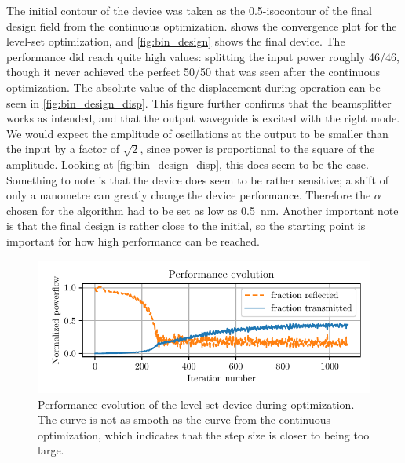 The initial contour of the device was taken as the 0.5-isocontour of the final
design field from the continuous optimization.
 shows the convergence plot for the level-set optimization,
and \cref{fig:bin_design} shows the final device.
The performance did reach quite high values: splitting the input power roughly
46/46, though it never achieved the perfect 50/50 that was seen after the
continuous optimization.
The absolute value of the displacement during operation can be seen in
\cref{fig:bin_design_disp}.
This figure further confirms that the beamsplitter works as intended, and that
the output waveguide is excited with the right mode.
We would expect the amplitude of oscillations at the output to be smaller than
the input by a factor of $\sqrt{2}$, since power is proportional to the square
of the amplitude.
Looking at \cref{fig:bin_design_disp}, this does seem to be the case.
Something to note is that the device does seem to be rather sensitive;
a shift of only a nanometre can greatly change the device performance.
Therefore the $\alpha$ chosen for the algorithm had to be set as low as
\qty{0.5}{\nm}.
Another important note is that the final design is rather close to the initial,
so the starting point is important for how high performance can be reached.

\begin{figure}[htpb]
	\centering
	\includegraphics{chapters/results/conv_tmp.pdf}
	\caption{%
		Performance evolution of the level-set device during optimization.
		The curve is not as smooth as the curve from the continuous
		optimization, which indicates that the step size is closer to being too
		large.
	}%
	\label{fig:bin_conv}
\end{figure}

